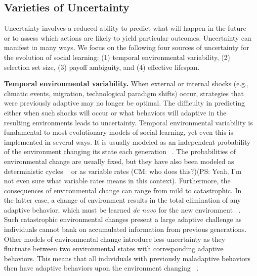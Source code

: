 \documentclass[letterpaper,11.5pt]{scrartcl}
\newcommand{\mt}[1]{{\textcolor{myorange} {({\tiny MT:} #1)}}}
\newcommand{\cm}[1]{{\textcolor{mypurple} {({\tiny CM:} #1)}}}
\newcommand{\ps}[1]{{\textcolor{mygreen} {({\tiny PS:} #1)}}}
\begin{document}

\subsection{Varieties of Uncertainty}

Uncertainty involves a reduced ability to predict what will happen in the future or to assess which actions are likely to yield particular outcomes. Uncertainty can manifest in many ways. We focus on the following four sources of uncertainty for the evolution of social learning: (1) temporal environmental variability, (2) selection set size, (3) payoff ambiguity, and (4) effective lifespan.

\textbf{Temporal environmental variability.}
When external or internal shocks (e.g., climatic events, migration, technological paradigm shifts) occur, strategies that were previously adaptive may no longer be optimal. The difficulty in predicting either when such shocks will occur or what behaviors will adaptive in the resulting environments leads to uncertainty. 
Temporal environmental variability is fundamental to most evolutionary models of social learning, yet even this is implemented in several ways. It is usually modeled as an independent probability of the environment changing its state each generation ~\cite{BoydRicherson1985,Rogers1988,Feldman1996,McElreath2005,Enquist2007,perreault2012bayesian,aoki2014evolution}. The probabilities of environmental change are usually fixed, %
but they have also been modeled as deterministic cycles ~\cite{Feldman1996, aoki2014evolution} or as variable rates \cm{who does this?}\ps{Yeah, I'm not even sure what variable rates means in this context}. Furthermore, the consequences of environmental change can range from mild to  catastrophic. In the latter case, a change of environment results in the total elimination of any adaptive behavior, which must be learned \emph{de novo} for the new environment ~\cite{Rogers1988}. Such catastrophic environmental changes present a large adaptive challenge as individuals cannot bank on accumulated information from previous generations. Other models of environmental change introduce less uncertainty as they fluctuate between two environmental states with corresponding adaptive behaviors. This means that all individuals with previously maladaptive behaviors then have adaptive behaviors upon the environment changing ~\cite{perreault2012bayesian}. 
\end{document}
